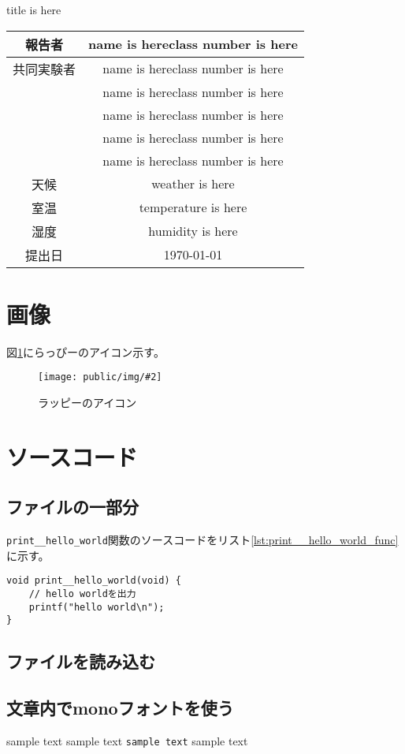 \documentclass[paper=a4paper]{jlreq}
\newcommand{\TITLE}{title is here}
\newcommand{\NAME}{name is here}
\newcommand{\NUMBER}{class number is here}
\newcommand{\WEATHER}{weather is here}
\newcommand{\TEMPERATURE}{temperature is here}
\newcommand{\HUMIDITY}{humidity is here}
\newcommand{\Figure}[4]{
  \begin{figure}[H]
    \centering
    \texttt{[image: public/img/\#2]}
    \caption{#3}
    \label{fig:#4}
  \end{figure}
}
\newcommand{\Inline}[1]{\lstinline[style=inline]{#1}}
\begin{document}
{\centering \LARGE \TITLE \par}

\begin{table}[b]
    \centering
    \begin{tabular}{|c|c|}
        \hline
        報告者   & \NAME \quad \NUMBER \\
        \hline
        共同実験者 & \NAME \quad \NUMBER \\
              & \NAME \quad \NUMBER \\
              & \NAME \quad \NUMBER \\
              & \NAME \quad \NUMBER \\
              & \NAME \quad \NUMBER \\
        \hline
        天候    & \WEATHER            \\
        \hline
        室温    & \TEMPERATURE        \\
        \hline
        湿度    & \HUMIDITY           \\
        \hline
        提出日   & \today              \\
        \hline
    \end{tabular}
\end{table}

\newpage


\section{画像}
図\ref{fig:rhappy_icon}にらっぴーのアイコン示す。
\Figure{0.5}{rhappy_icon.jpg}{ラッピーのアイコン}{rhappy_icon}

\section{ソースコード}
\subsection{ファイルの一部分}
\Inline{print__hello_world}関数のソースコードをリスト\ref{lst:print__hello_world_func}に示す。  

\begin{lstlisting}[caption={print\_\_hello\_world関数のソースコード}, label={lst:print__hello_world_func}]
void print__hello_world(void) {
    // hello worldを出力
    printf("hello world\n");
}
\end{lstlisting}

\subsection{ファイルを読み込む}


\subsection{文章内でmonoフォントを使う}
sample text sample text \Inline{sample text} sample text
\end{document}
